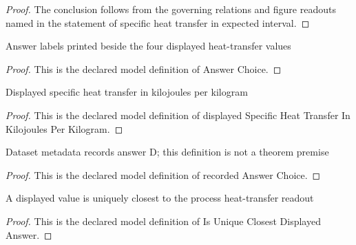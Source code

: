 \begin{proof}
  The conclusion follows from the governing relations and figure readouts named in the statement of specific heat transfer in expected interval.
\end{proof}
\begin{definition}
  \label{def:physics:phyx-mini-0459:phyxminiproblems-problemphyxmini0459-answerchoice}
  Answer labels printed beside the four displayed heat-transfer values
\end{definition}
\begin{proof}
  This is the declared model definition of Answer Choice.
\end{proof}
\begin{definition}
  \label{def:physics:phyx-mini-0459:phyxminiproblems-problemphyxmini0459-displayedspecificheattransferinkilojoulesperkilogram}
  Displayed specific heat transfer in kilojoules per kilogram
\end{definition}
\begin{proof}
  This is the declared model definition of displayed Specific Heat Transfer In Kilojoules Per Kilogram.
\end{proof}
\begin{definition}
  \label{def:physics:phyx-mini-0459:phyxminiproblems-problemphyxmini0459-recordedanswerchoice}
  Dataset metadata records answer D; this definition is not a theorem premise
\end{definition}
\begin{proof}
  This is the declared model definition of recorded Answer Choice.
\end{proof}
\begin{definition}
  \label{def:physics:phyx-mini-0459:phyxminiproblems-problemphyxmini0459-isuniqueclosestdisplayedanswer}
  A displayed value is uniquely closest to the process heat-transfer readout
\end{definition}
\begin{proof}
  This is the declared model definition of Is Unique Closest Displayed Answer.
\end{proof}
